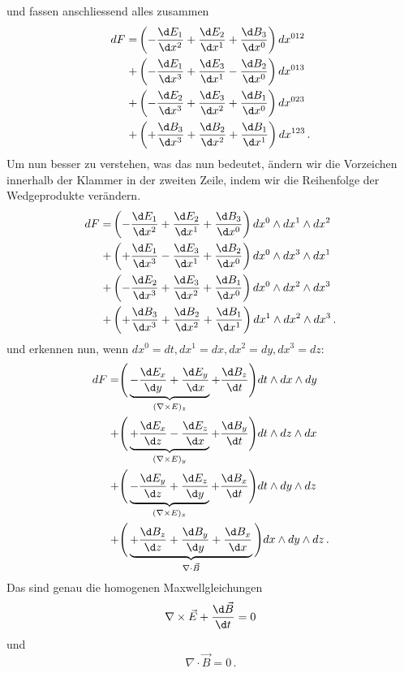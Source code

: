und fassen anschliessend alles zusammen
\begin{align*}
	dF =
	&\left( - \frac{\d E_1}{\d x^2} + \frac{\d E_2}{\d x^1} + \frac{\d B_3}{\d x^0} \right) dx^{012}
	\\
	+&\left( - \frac{\d E_1}{\d x^3} + \frac{\d E_3}{\d x^1} - \frac{\d B_2}{\d x^0} \right) dx^{013}
	\\
	+&\left( - \frac{\d E_2}{\d x^3} + \frac{\d E_3}{\d x^2} + \frac{\d B_1}{\d x^0} \right) dx^{023}
	\\
	+&\left( + \frac{\d B_3}{\d x^3} + \frac{\d B_2}{\d x^2} + \frac{\d B_1}{\d x^1} \right) dx^{123} \, .
\end{align*}
 Um nun besser zu verstehen, was das nun bedeutet, ändern wir die Vorzeichen innerhalb der Klammer in der zweiten Zeile, indem wir die Reihenfolge der Wedgeprodukte verändern.
\begin{align*}
	dF =
	&\left( - \frac{\d E_1}{\d x^2} + \frac{\d E_2}{\d x^1} + \frac{\d B_3}{\d x^0} \right) dx^0 \wedge dx^1 \wedge dx^2
	\\
	+&\left( + \frac{\d E_1}{\d x^3} - \frac{\d E_3}{\d x^1} + \frac{\d B_2}{\d x^0} \right) dx^0 \wedge dx^3 \wedge dx^1
	\\
	+&\left( - \frac{\d E_2}{\d x^3} + \frac{\d E_3}{\d x^2} + \frac{\d B_1}{\d x^0} \right) dx^0 \wedge dx^2 \wedge dx^3
	\\
	+&\left( + \frac{\d B_3}{\d x^3} + \frac{\d B_2}{\d x^2} + \frac{\d B_1}{\d x^1} \right) dx^1 \wedge dx^2 \wedge dx^3 \, .
\end{align*}
und erkennen nun, wenn $dx^0 = dt, dx^1 = dx, dx^2 = dy, dx^3 = dz$:
\begin{align*}
	dF =
	&\Bigg( \underbrace{ - \frac{\d E_x}{\d y} + \frac{\d E_y}{\d x}}_{(\nabla \times E)_z} + \frac{\d B_z}{\d t} \Bigg) dt \wedge dx \wedge dy
	\\
	+&\Bigg( \underbrace{ + \frac{\d E_x}{\d z} - \frac{\d E_z}{\d x}}_{(\nabla \times E)_y} + \frac{\d B_y}{\d t} \Bigg) dt \wedge dz \wedge dx
	\\
	+&\Bigg( \underbrace{ - \frac{\d E_y}{\d z} + \frac{\d E_z}{\d y}}_{(\nabla \times E)_x} + \frac{\d B_x}{\d t} \Bigg) dt \wedge dy \wedge dz
	\\
	+&\Bigg( \underbrace{ + \frac{\d B_z}{\d z} + \frac{\d B_y}{\d y} + \frac{\d B_x}{\d x}}_{\nabla \cdot \vec{B}} \Bigg) dx \wedge dy \wedge dz \, .
\end{align*}
Das sind genau die homogenen Maxwellgleichungen
\[
\nabla \times \vec{E} + \frac{\d \vec{B}}{\d t} = 0
\]
und
\[
\nabla \cdot \vec{B} = 0 \, .
\]

